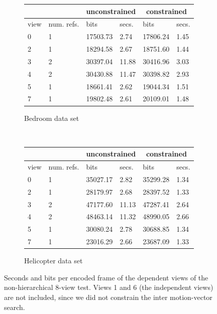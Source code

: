 \documentclass{sig-alternate-05-2015}
\begin{document}
\begin{figure}[H]
\centering\small
\begin{subfigure}{.5\textwidth}
\centering
\begin{tabular}{|l|l|l|l|l|l|}
\multicolumn{2}{c}{} & \multicolumn{2}{c}{unconstrained} & \multicolumn{2}{c}{constrained} \\ \hline
view & num. refs.    & bits            & secs.           & bits            & secs.         \\ \hline
0    & 1             & 17503.73        & 2.74            & 17806.24        & 1.45          \\ \hline
2    & 1             & 18294.58        & 2.67            & 18751.60        & 1.44          \\ \hline
3    & 2             & 30397.04        & 11.88           & 30416.96        & 3.03          \\ \hline
4    & 2             & 30430.88        & 11.47           & 30398.82        & 2.93          \\ \hline
5    & 1             & 18661.41        & 2.62            & 19044.34        & 1.51          \\ \hline
7    & 1             & 19802.48        & 2.61            & 20109.01        & 1.48          \\ \hline
\end{tabular}
\caption{Bedroom data set}
\label{fig:bedroom-time-constrained}
\end{subfigure} \\
\begin{subfigure}{.5\textwidth}
\centering
\begin{tabular}{|l|l|l|l|l|l|}
\multicolumn{2}{c}{} & \multicolumn{2}{c}{unconstrained} & \multicolumn{2}{c}{constrained} \\ \hline
view & num. refs.    & bits            & secs.           & bits            & secs.         \\ \hline
0    & 1             & 35027.17        & 2.82            & 35299.28        & 1.34          \\ \hline
2    & 1             & 28179.97        & 2.68            & 28397.52        & 1.33          \\ \hline
3    & 2             & 47177.60        & 11.13           & 47287.41        & 2.64          \\ \hline
4    & 2             & 48463.14        & 11.32           & 48990.05        & 2.66          \\ \hline
5    & 1             & 30080.24        & 2.78            & 30688.85        & 1.34          \\ \hline
7    & 1             & 23016.29        & 2.66            & 23687.09        & 1.33          \\ \hline
\end{tabular}
\caption{Helicopter data set}
\label{fig:helicopter-time-constrained}
\end{subfigure}
\caption{Seconds and bits per encoded frame of the dependent views of the
non-hierarchical 8-view test. Views 1 and 6 (the independent views) are not
included, since we did not constrain the inter motion-vector search.}
\label{fig:time-constrained}
\end{figure}
\end{document}
